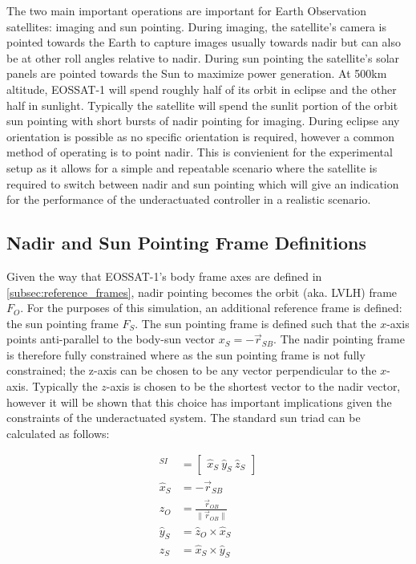 The two main important operations are important for Earth Observation satellites: imaging and sun pointing. During imaging, the satellite's camera is pointed towards the Earth to capture images usually towards nadir but can also be at other roll angles relative to nadir. During sun pointing the satellite's solar panels are pointed towards the Sun to maximize power generation. At 500km altitude, EOSSAT-1 will spend roughly half of its orbit in eclipse and the other half in sunlight. Typically the satellite will spend the sunlit portion of the orbit sun pointing with short bursts of nadir pointing for imaging. During eclipse any orientation is possible as no specific orientation is required, however a common method of operating is to point nadir. This is convienient for the experimental setup as it allows for a simple and repeatable scenario where the satellite is required to switch between nadir and sun pointing which will give an indication for the performance of the underactuated controller in a realistic scenario. 


\subsection{Nadir and Sun Pointing Frame Definitions}
Given the way that EOSSAT-1's body frame axes are defined in \autoref{subsec:reference_frames}, nadir pointing becomes the orbit (aka. LVLH) frame $F_O$. For the purposes of this simulation, an additional reference frame is defined: the sun pointing frame $F_S$. The sun pointing frame is defined such that the $x$-axis points anti-parallel to the body-sun vector $x_S = -\vec{r}_{SB}$. The nadir pointing frame is therefore fully constrained where as the sun pointing frame is not fully constrained; the z-axis can be chosen to be any vector perpendicular to the $x$-axis. Typically the $z$-axis is chosen to be the shortest vector to the nadir vector, however it will be shown that this choice has important implications given the constraints of the underactuated system. The standard sun triad can be calculated as follows:

\begin{align*}
    [T]^{SI}  &= \begin{bmatrix}
        \hat{x}_S \
        \hat{y}_S \
        \hat{z}_S
    \end{bmatrix} \\
    \hat{x}_S &= -\vec{r}_{SB} \\
    \hat{z}_O &= \frac{\vec{r}_{OB}}{\|\vec{r}_{OB}\|} \\
    \hat{y}_S &= \hat{z}_O \times \hat{x}_S \\
    \hat{z}_S &= \hat{x}_S \times \hat{y}_S 
\end{align*}

